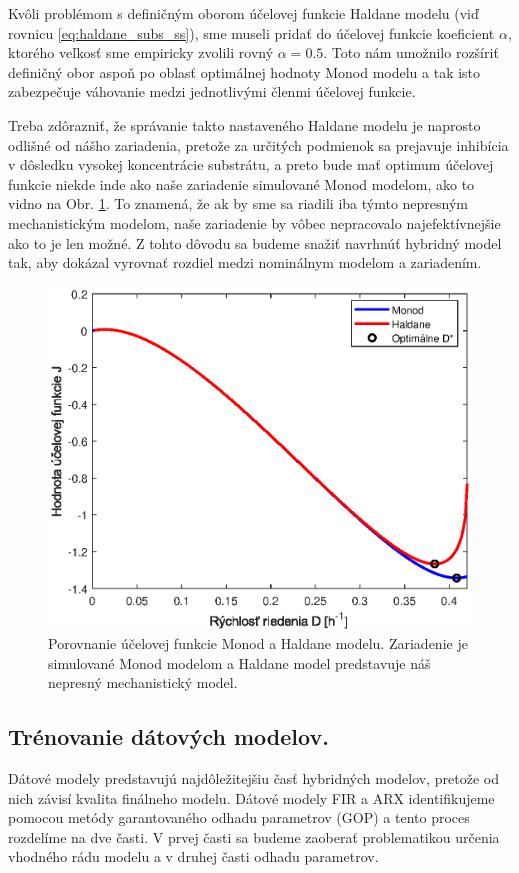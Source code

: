 Kvôli problémom s definičným oborom účelovej funkcie Haldane modelu (viď rovnicu \eqref{eq:haldane_subs_ss}), sme museli pridať do účelovej funkcie koeficient $ \alpha $, ktorého veľkosť sme empiricky zvolili rovný $ \alpha = 0.5 $. Toto nám umožnilo rozšíriť definičný obor aspoň po oblasť optimálnej hodnoty Monod modelu a tak isto zabezpečuje váhovanie medzi jednotlivými členmi účelovej funkcie.

Treba zdôrazniť, že správanie takto nastaveného Haldane modelu je naprosto odlišné od nášho zariadenia, pretože za určitých podmienok sa prejavuje inhibícia v dôsledku vysokej koncentrácie substrátu, a preto bude mať optimum účelovej funkcie niekde inde ako naše zariadenie simulované Monod modelom, ako to vidno na Obr. \ref{fig:cost_fun_comparison}. To znamená, že ak by sme sa riadili iba týmto nepresným mechanistickým modelom, naše zariadenie by vôbec nepracovalo najefektívnejšie ako to je len možné. Z tohto dôvodu sa budeme snažiť navrhnúť hybridný model tak, aby dokázal vyrovnať rozdiel medzi nominálnym modelom a zariadením. 
\begin{figure}
	\centering
	\includegraphics[width=0.7\linewidth]{images/cost_fun_comparison}
	\caption{Porovnanie účelovej funkcie Monod a Haldane modelu. Zariadenie je simulované Monod modelom a Haldane model predstavuje náš nepresný mechanistický model.}
	\label{fig:cost_fun_comparison}
\end{figure}

\subsection*{Trénovanie dátových modelov.} Dátové modely predstavujú najdôležitejšiu časť hybridných modelov, pretože od nich závisí kvalita finálneho modelu. Dátové modely FIR a ARX identifikujeme pomocou metódy garantovaného odhadu parametrov (GOP) a tento proces rozdelíme na dve časti. V prvej časti sa budeme zaoberať problematikou určenia vhodného rádu modelu a v druhej časti odhadu parametrov.

